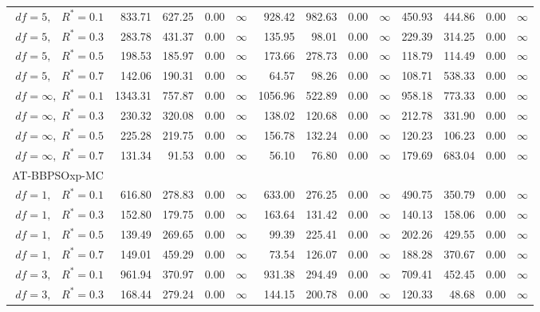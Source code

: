 \documentclass[cmbright]{staauth}
\begin{document}
\begin{table}[ht]
{\begin{tabular}{r|rrrr|rrrr|rrrr}
  $df = 5,\enspace$ $R^* =0.1$ & 833.71 & 627.25 & 0.00 & $\infty$ & 928.42 & 982.63 & 0.00 & $\infty$ & 450.93 & 444.86 & 0.00 & $\infty$ \\
  $df = 5,\enspace$ $R^* =0.3$ & 283.78 & 431.37 & 0.00 & $\infty$ & 135.95 & 98.01 & 0.00 & $\infty$ & 229.39 & 314.25 & 0.00 & $\infty$ \\
  $df = 5,\enspace$ $R^* =0.5$ & 198.53 & 185.97 & 0.00 & $\infty$ & 173.66 & 278.73 & 0.00 & $\infty$ & 118.79 & 114.49 & 0.00 & $\infty$ \\
  $df = 5,\enspace$ $R^* =0.7$ & 142.06 & 190.31 & 0.00 & $\infty$ & 64.57 & 98.26 & 0.00 & $\infty$ & 108.71 & 538.33 & 0.00 & $\infty$ \\
  $df = \infty,$ $R^* =0.1$ & 1343.31 & 757.87 & 0.00 & $\infty$ & 1056.96 & 522.89 & 0.00 & $\infty$ & 958.18 & 773.33 & 0.00 & $\infty$ \\
  $df = \infty,$ $R^* =0.3$ & 230.32 & 320.08 & 0.00 & $\infty$ & 138.02 & 120.68 & 0.00 & $\infty$ & 212.78 & 331.90 & 0.00 & $\infty$ \\
  $df = \infty,$ $R^* =0.5$ & 225.28 & 219.75 & 0.00 & $\infty$ & 156.78 & 132.24 & 0.00 & $\infty$ & 120.23 & 106.23 & 0.00 & $\infty$ \\
  $df = \infty,$ $R^* =0.7$ & 131.34 & 91.53 & 0.00 & $\infty$ & 56.10 & 76.80 & 0.00 & $\infty$ & 179.69 & 683.04 & 0.00 & $\infty$ \\
\hline
\multicolumn{1}{l|}{AT-BBPSOxp-MC} &&&&&&&&&&&&\\
  $df = 1,\enspace$ $R^* =0.1$ & 616.80 & 278.83 & 0.00 & $\infty$ & 633.00 & 276.25 & 0.00 & $\infty$ & 490.75 & 350.79 & 0.00 & $\infty$ \\
  $df = 1,\enspace$ $R^* =0.3$ & 152.80 & 179.75 & 0.00 & $\infty$ & 163.64 & 131.42 & 0.00 & $\infty$ & 140.13 & 158.06 & 0.00 & $\infty$ \\
  $df = 1,\enspace$ $R^* =0.5$ & 139.49 & 269.65 & 0.00 & $\infty$ & 99.39 & 225.41 & 0.00 & $\infty$ & 202.26 & 429.55 & 0.00 & $\infty$ \\
  $df = 1,\enspace$ $R^* =0.7$ & 149.01 & 459.29 & 0.00 & $\infty$ & 73.54 & 126.07 & 0.00 & $\infty$ & 188.28 & 370.67 & 0.00 & $\infty$ \\
  $df = 3,\enspace$ $R^* =0.1$ & 961.94 & 370.97 & 0.00 & $\infty$ & 931.38 & 294.49 & 0.00 & $\infty$ & 709.41 & 452.45 & 0.00 & $\infty$ \\
  $df = 3,\enspace$ $R^* =0.3$ & 168.44 & 279.24 & 0.00 & $\infty$ & 144.15 & 200.78 & 0.00 & $\infty$ & 120.33 & 48.68 & 0.00 & $\infty$ \\

\end{tabular}}
\end{table}
\end{document}
